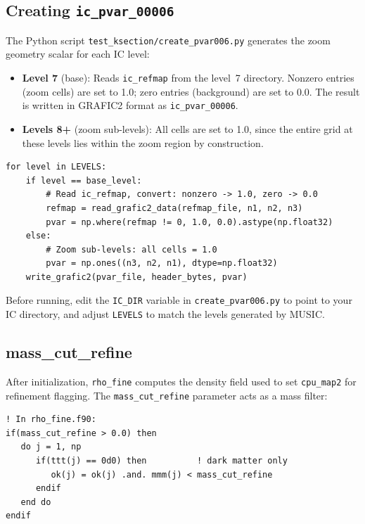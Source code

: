 \documentclass[11pt,fleqn]{book}
\begin{document}
\subsection{Creating \texttt{ic\_pvar\_00006}}

The Python script \texttt{test\_ksection/create\_pvar006.py} generates the zoom geometry scalar for each IC level:

\begin{itemize}[leftmargin=2em]
  \item \textbf{Level 7} (base): Reads \texttt{ic\_refmap} from the level~7 directory. Nonzero entries (zoom cells) are set to 1.0; zero entries (background) are set to 0.0. The result is written in GRAFIC2 format as \texttt{ic\_pvar\_00006}.
  \item \textbf{Levels 8+} (zoom sub-levels): All cells are set to 1.0, since the entire grid at these levels lies within the zoom region by construction.
\end{itemize}

\begin{codebox}
\begin{lstlisting}[style=bash,numbers=none]
for level in LEVELS:
    if level == base_level:
        # Read ic_refmap, convert: nonzero -> 1.0, zero -> 0.0
        refmap = read_grafic2_data(refmap_file, n1, n2, n3)
        pvar = np.where(refmap != 0, 1.0, 0.0).astype(np.float32)
    else:
        # Zoom sub-levels: all cells = 1.0
        pvar = np.ones((n3, n2, n1), dtype=np.float32)
    write_grafic2(pvar_file, header_bytes, pvar)
\end{lstlisting}
\end{codebox}

\begin{infobox}
Before running, edit the \texttt{IC\_DIR} variable in \texttt{create\_pvar006.py} to point to your IC directory, and adjust \texttt{LEVELS} to match the levels generated by MUSIC.
\end{infobox}

\subsection{mass\_cut\_refine}

After initialization, \texttt{rho\_fine} computes the density field used to set \texttt{cpu\_map2} for refinement flagging. The \texttt{mass\_cut\_refine} parameter acts as a mass filter:

\begin{lstlisting}[style=fortran,numbers=none]
! In rho_fine.f90:
if(mass_cut_refine > 0.0) then
   do j = 1, np
      if(ttt(j) == 0d0) then          ! dark matter only
         ok(j) = ok(j) .and. mmm(j) < mass_cut_refine
      endif
   end do
endif
\end{lstlisting}
\end{document}
